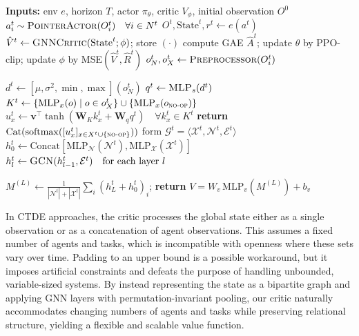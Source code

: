 \begin{algorithm}[t]
\caption{\textsc{PLATO: Pointer Actor, GNN Critic and training}}
\label{alg:plato}
\small
\begin{algorithmic}[1]
\State \textbf{Inputs:} env $e$, horizon $T$, actor $\pi_\theta$, critic $V_\phi$, initial observation $O^0$
  \State $a^t_i\sim \textsc{PointerActor}(O_i^t) \quad \forall i \in N^t$
  \State $O^t,\text{State}^t,r^t\gets e(a^t)$
  \State $\hat V^t \gets \textsc{GNNCritic}(\text{State}^t;\phi)$;\; store $(\cdot)$
  \State  compute GAE $\hat A^t$;\; update $\theta$ by PPO-clip;\; update $\phi$ by MSE$(\hat V^t,\hat R^t)$
\EndFor
{}
  \State $o_N^t,o_X^t\gets \textsc{Preprocessor}(O_i^t)$ 
  
  \State $d^t\!\gets\![\mu,\sigma^2,\min,\max](o^t_{N})$
  \State $q^t \gets \textsc{MLP}_s(d^t)$
  \State $K^t \gets \{\mathrm{MLP}_x(o) \mid o \in o_X^t\} \cup \{\mathrm{MLP}_x(o_{\textsc{no-op}})\}$ 
  \State $u_x^t\!\gets\!\mathbf{v}^\top\tanh(\mathbf{W}_K k_x^t+\mathbf{W}_q q^t) \quad \forall k_x^t \in K^t$ 
  \State  \textbf{return} $\mathrm{Cat}(\mathrm{softmax}([u_x^t]_{x \in X^t \cup \{\textsc{no-op}\}}))$
\EndProcedure
{} 
  \State form $\mathcal{G}^t=\langle\mathcal{X}^t,\mathcal{N}^t,\mathcal{E}^t\rangle$
  \State $h_0^t \gets \text{Concat}\left [\text{MLP}_{\mathcal{N}}\left ( \mathcal{N}^t \right ), \text{MLP}_\mathcal{X}\left(\mathcal{X}^t \right ) \right ]$
  \State $h^t_l \gets \textsc{GCN}(h^t_{l-1}, \mathcal{E}^t) \quad \text{for each layer }l$

    \State $M^{(L)}\!\gets\!\frac{1}{|\mathcal{N}^t|+|\mathcal{X}^t|}\sum_i(h^t_L + h^t_0)_i$;\; \label{line:critic_pool}
  \State \textbf{return} $V=W_v\,\mathrm{MLP}_v(M^{(L)})+b_v$ \label{line:critic_value}

\EndProcedure

\end{algorithmic}
\end{algorithm}


\iffalse
In CTDE approaches, the critic processes the global state either as a single observation or as a concatenation of agent observations. This assumes a fixed number of agents and tasks, which is incompatible with openness where these sets vary over time. Padding to an upper bound is a possible workaround, but it imposes artificial constraints and defeats the purpose of handling unbounded, variable-sized systems. By instead representing the state as a bipartite graph and applying GNN layers with permutation-invariant pooling, our critic naturally accommodates changing numbers of agents and tasks while preserving relational structure, yielding a flexible and scalable value function.


